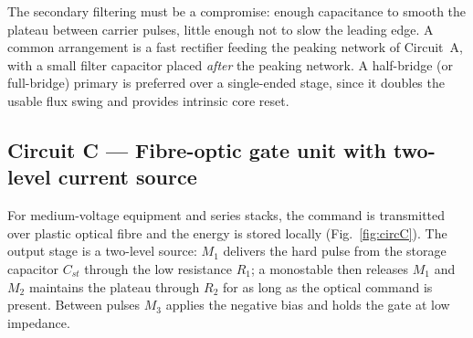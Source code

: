 \documentclass[11pt,a4paper]{article}
\begin{document}
The secondary filtering must be a compromise: enough capacitance to smooth the
plateau between carrier pulses, little enough not to slow the leading edge. A
common arrangement is a fast rectifier feeding the peaking network of Circuit~A,
with a small filter capacitor placed \emph{after} the peaking network. A half-bridge
(or full-bridge) primary is preferred over a single-ended stage, since it doubles
the usable flux swing and provides intrinsic core reset.

\subsection{Circuit C --- Fibre-optic gate unit with two-level current source}

For medium-voltage equipment and series stacks, the command is transmitted over
plastic optical fibre and the energy is stored locally (Fig.~\ref{fig:circC}). The
output stage is a two-level source: $M_1$ delivers the hard pulse from the storage
capacitor $C_{st}$ through the low resistance $R_1$; a monostable then releases
$M_1$ and $M_2$ maintains the plateau through $R_2$ for as long as the optical
command is present. Between pulses $M_3$ applies the negative bias and holds the
gate at low impedance.
\end{document}
